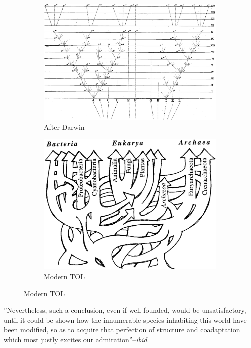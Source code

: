 \documentclass[]{article}
\begin{document}
\begin{figure}[H]
	\caption{Two views of the Tree of Life}
	\begin{subfigure}[b]{0.45\textwidth}
		\caption{After Darwin}\label{fig:TOL:Darwin}
		\includegraphics[width=\textwidth]{TOL_Darwin}
	\end{subfigure}
	\begin{subfigure}[b]{0.45\textwidth}
		\caption{Modern TOL}\label{fig:TOL:Modern}
		\includegraphics[width=\textwidth]{TOL-5-6}
	\end{subfigure}
\end{figure}

''Nevertheless, such a conclusion, even if well founded, would be unsatisfactory, until it could be shown how the innumerable species inhabiting this world have been modified, so as to acquire that perfection of structure and coadaptation which most justly excites our admiration''--\textit{ibid}.
\end{document}
